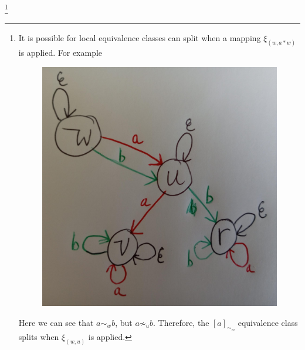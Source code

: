 \footnote{
It is possible for local equivalence classes can split when a mapping $\xi_{(w, a \ast w)}$ is applied.
For example
\begin{figure}[H]
    \includegraphics[width=0.5\linewidth]{6BeyondSBDRLLocalAlgebras/Images/local_equiv_classes_can_split_when_action_performed.jpeg}
    \caption{
    }
\end{figure}
Here we can see that $a \sim_{w} b$, but $a \not\sim_{u} b$.
Therefore, the $[a]_{\sim_{w}}$ equivalence class splits when $\xi_{(w, u)}$ is applied.
}



